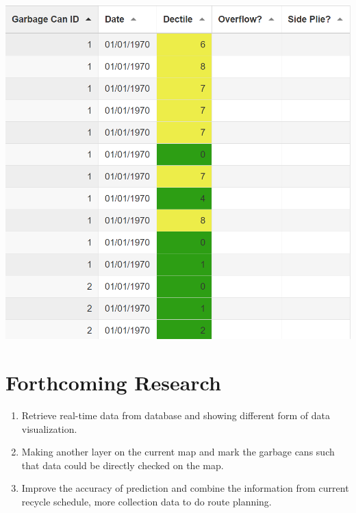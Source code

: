 \documentclass[a0,portrait]{a0poster}
\begin{document}
\begin{multicols}{3}
\begin{center}
\end{center}
\begin{center}
\includegraphics[width=\linewidth]{database02.PNG}
\end{center}

\color{Black} %


\section*{Forthcoming Research}
\begin{enumerate}
\item Retrieve real-time data from database and showing different form of data visualization.
\item Making another layer on the current map and mark the garbage cans such that data could be directly checked on the map.
\item Improve the accuracy of prediction and combine the information from current recycle schedule, more collection data to do route planning. 
\end{enumerate}


\end{multicols}
\end{document}
